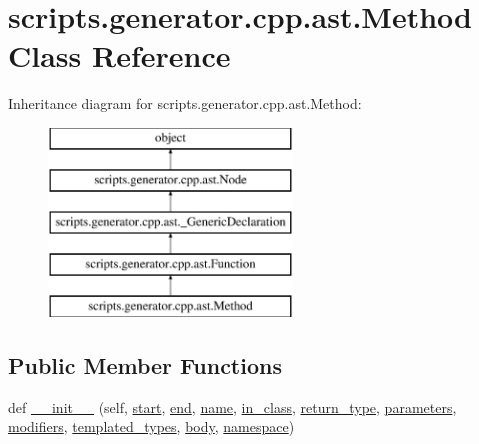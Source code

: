 \hypertarget{classscripts_1_1generator_1_1cpp_1_1ast_1_1_method}{}\section{scripts.\+generator.\+cpp.\+ast.\+Method Class Reference}
\label{classscripts_1_1generator_1_1cpp_1_1ast_1_1_method}
Inheritance diagram for scripts.\+generator.\+cpp.\+ast.\+Method\+:\begin{figure}[H]
\begin{center}
\leavevmode
\includegraphics[height=5.000000cm]{d5/d62/classscripts_1_1generator_1_1cpp_1_1ast_1_1_method}
\end{center}
\end{figure}
\subsection*{Public Member Functions}
\begin{DoxyCompactItemize}
\item 
def \mbox{\hyperlink{classscripts_1_1generator_1_1cpp_1_1ast_1_1_method_a21d016bf29107c66ac7f37640a468888}{\+\_\+\+\_\+init\+\_\+\+\_\+}} (self, \mbox{\hyperlink{classscripts_1_1generator_1_1cpp_1_1ast_1_1_node_a27ce0a583baee598b75ac6dd21f8575b}{start}}, \mbox{\hyperlink{classscripts_1_1generator_1_1cpp_1_1ast_1_1_node_a8e3394f9dd405352610ff9be4f284e2c}{end}}, \mbox{\hyperlink{classscripts_1_1generator_1_1cpp_1_1ast_1_1___generic_declaration_a7cc4e9a1dace9c627d7fe4ce614a8888}{name}}, \mbox{\hyperlink{classscripts_1_1generator_1_1cpp_1_1ast_1_1_method_aa88ab693dcff49c69f7b84c4a77f7888}{in\+\_\+class}}, \mbox{\hyperlink{classscripts_1_1generator_1_1cpp_1_1ast_1_1_function_a883453721a1ad4500c1103f08ee182ef}{return\+\_\+type}}, \mbox{\hyperlink{classscripts_1_1generator_1_1cpp_1_1ast_1_1_function_a3722158a9f32403cf0380a5d1ba3f035}{parameters}}, \mbox{\hyperlink{classscripts_1_1generator_1_1cpp_1_1ast_1_1_function_a2c3d4f1339ae74225cd691707abc669a}{modifiers}}, \mbox{\hyperlink{classscripts_1_1generator_1_1cpp_1_1ast_1_1_function_a54dbe525d1ce621370e76e8dc0bacae2}{templated\+\_\+types}}, \mbox{\hyperlink{classscripts_1_1generator_1_1cpp_1_1ast_1_1_function_a7dbb61df4b5716e8f14d6547b8798a6a}{body}}, \mbox{\hyperlink{classscripts_1_1generator_1_1cpp_1_1ast_1_1___generic_declaration_a6e7fb8f951551af19f2366876a150817}{namespace}})
\end{DoxyCompactItemize}
